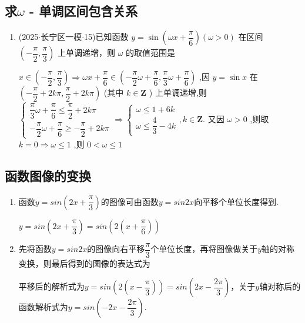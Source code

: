 \subsection*{求$\omega$ - 单调区间包含关系}
\begin{enumerate}
    \item (2025$\cdot$长宁区一模$\cdot$15)已知函数 $y = \sin \left( {{\omega x} + \dfrac{\pi }{6}}\right) \left( {\omega  > 0}\right)$ 在区间 $\left( {-\dfrac{\pi }{2},\dfrac{\pi }{3}}\right)$ 上单调递增，则 $\omega$ 的取值范围是 
    \begin{jieda}
        $x \in  \left( {-\dfrac{\pi }{2},\dfrac{\pi }{3}}\right)  \Longrightarrow  {\omega x} + \dfrac{\pi }{6} \in  \left( {-\dfrac{\pi }{2}\omega  + \dfrac{\pi }{6},\dfrac{\pi }{3}\omega  + }\right.  \left. \dfrac{\pi }{6}\right)$ ,因 $y = \sin x$ 在 $\left( {-\dfrac{\pi }{2} + {2k\pi },\dfrac{\pi }{2} + {2k\pi }}\right)$ (其中 $k \in  \mathbf{Z}$ ) 上单调递增,则 $\left\{  {\begin{array}{l} \dfrac{\pi }{3}\omega  + \dfrac{\pi }{6} \leq  \dfrac{\pi }{2} + {2k\pi } \\   - \dfrac{\pi }{2}\omega  + \dfrac{\pi }{6} \geq   - \dfrac{\pi }{2} + {2k\pi } \end{array} \Longrightarrow  \left\{  {\begin{array}{l} \omega  \leq  1 + {6k} \\  \omega  \leq  \dfrac{4}{3} - {4k} \end{array},k \in \mathbf{Z}}\right. }\right.$. 又因 $\omega  > 0$ ,则取 $k = 0 \Longrightarrow  \omega  \leq  1$ ,则 $0 < \omega  \leq  1$
    \end{jieda}
\end{enumerate}
\subsection*{函数图像的变换}
\begin{enumerate}
    \item  函数$y = sin\left(2x+\dfrac{\pi}{3}\right)$的图像可由函数$y = sin2x$向平移个单位长度得到.
    \begin{jieda}
        $y = sin(2x+\dfrac{\pi}{3}) = sin(2(x+\dfrac{\pi}{6}))$
    \end{jieda}
    \item 先将函数$y = sin2x$的图像向右平移$\dfrac{\pi}{3}$个单位长度，再将图像做关于$y$轴的对称变换，则最后得到的图像的表达式为
    \begin{jieda}
        平移后的解析式为$y = sin(2(x-\dfrac{\pi}{3})) = sin(2x - \dfrac{2\pi}{3})$，关于$y$轴对称后的函数解析式为$y = sin(-2x - \dfrac{2\pi}{3})$.
    \end{jieda}
\end{enumerate}
